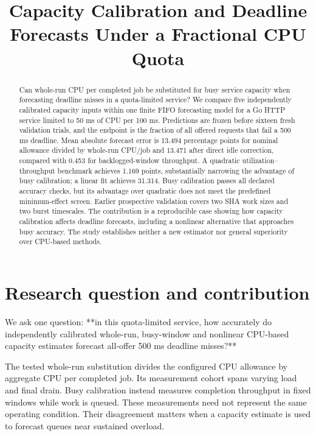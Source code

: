 \documentclass[11pt,a4paper]{article}
\title{Capacity Calibration and Deadline Forecasts Under a Fractional CPU Quota}
\author{}
\date{}
\begin{document}
\maketitle

\begin{abstract}

Can whole-run CPU per completed job be substituted for busy service capacity
when forecasting deadline misses in a quota-limited service? We compare five
independently calibrated capacity inputs within one finite FIFO forecasting
model for a Go HTTP service limited to 50 ms of CPU per 100 ms. Predictions
are frozen before sixteen fresh validation trials, and the endpoint is the
fraction of all offered requests that fail a 500 ms deadline. Mean absolute
forecast error is 13.494 percentage points for nominal allowance divided by
whole-run CPU/job and 13.471 after direct idle correction, compared with 0.453
for backlogged-window throughput. A quadratic utilization–throughput benchmark
achieves 1.169 points, substantially narrowing the advantage of busy
calibration; a linear fit achieves 31.314. Busy calibration passes all declared
accuracy checks, but its advantage over quadratic does not meet the predefined
minimum-effect screen. Earlier prospective validation covers two SHA work
sizes and two burst timescales. The contribution is a reproducible case showing
how capacity calibration affects deadline forecasts, including a
nonlinear alternative that approaches busy accuracy. The study establishes
neither a new estimator nor general superiority over CPU-based methods.

\end{abstract}
\section{Research question and contribution}

We ask one question: **in this quota-limited service, how accurately do
independently calibrated whole-run, busy-window and nonlinear CPU-based
capacity estimates forecast all-offer 500 ms deadline misses?**

The tested whole-run substitution divides the configured CPU allowance by
aggregate CPU per completed job. Its measurement cohort spans varying load
and final drain. Busy calibration instead measures completion throughput in
fixed windows while work is queued. These measurements need not represent
the same operating condition. Their disagreement matters when a capacity
estimate is used to forecast queues near sustained overload.
\end{document}
